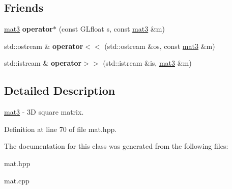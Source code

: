 \subsection*{Friends}
\begin{DoxyCompactItemize}
\item 
\hypertarget{class_angel_1_1mat3_ad9345c93609b63264fb4a4d48cef9e47}{\hyperlink{class_angel_1_1mat3}{mat3} {\bfseries operator$\ast$} (const G\-Lfloat s, const \hyperlink{class_angel_1_1mat3}{mat3} \&m)}\label{class_angel_1_1mat3_ad9345c93609b63264fb4a4d48cef9e47}

\item 
\hypertarget{class_angel_1_1mat3_a85d71885cc6797f2553701eb01c52851}{std\-::ostream \& {\bfseries operator$<$$<$} (std\-::ostream \&os, const \hyperlink{class_angel_1_1mat3}{mat3} \&m)}\label{class_angel_1_1mat3_a85d71885cc6797f2553701eb01c52851}

\item 
\hypertarget{class_angel_1_1mat3_aa6ac075e9f3776b3d6eba3e8207ab990}{std\-::istream \& {\bfseries operator$>$$>$} (std\-::istream \&is, \hyperlink{class_angel_1_1mat3}{mat3} \&m)}\label{class_angel_1_1mat3_aa6ac075e9f3776b3d6eba3e8207ab990}

\end{DoxyCompactItemize}


\subsection{Detailed Description}
\hyperlink{class_angel_1_1mat3}{mat3} -\/ 3\-D square matrix. 

Definition at line 70 of file mat.\-hpp.



The documentation for this class was generated from the following files\-:\begin{DoxyCompactItemize}
\item 
mat.\-hpp\item 
mat.\-cpp\end{DoxyCompactItemize}
